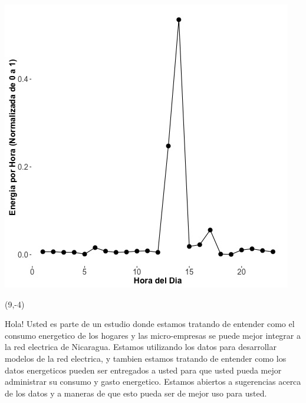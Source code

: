 \documentclass{article}\usepackage[]{graphicx}\usepackage[]{color}
\newenvironment{knitrout}{}{} %
\begin{document}
\begin{knitrout}
\color{fgcolor}
\includegraphics[scale=0.75]{figure/A22_fplot_norm_median} 
\end{knitrout}

 \begin{textblock}{1}(9,-4)
\begin{minipage}{20em}
\begingroup

\endgroup
\end{minipage}
\end{textblock}



\vspace{70px}
\begin{knitrout}
Hola! Usted es parte de un estudio donde estamos tratando de entender como el consumo energetico de los hogares y las micro-empresas se puede mejor integrar a la red electrica de Nicaragua. Estamos utilizando los datos para desarrollar modelos de la red electrica, y tambien estamos tratando de entender como los datos energeticos pueden ser entregados a usted para que usted pueda mejor administrar su consumo y gasto energetico.  Estamos abiertos a sugerencias acerca de los datos y a maneras de que esto pueda ser de mejor uso para usted.
\end{knitrout}
\end{document}
